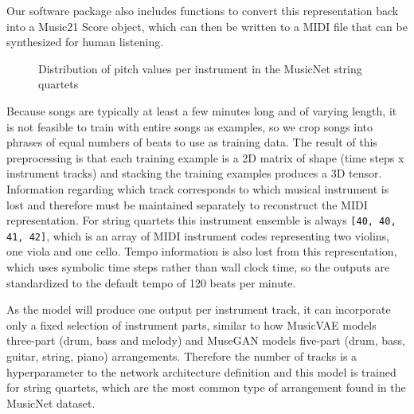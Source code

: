 \documentclass[sigconf,authorversion]{acmart}
\begin{document}
Our software package also includes functions to convert this
representation back into a Music21 Score object, which can then be
written to a MIDI file that can be synthesized for human listening.

\begin{figure}[htbp]
    \begin{center}
        \scalebox{0.6}{}
    \end{center}
    \caption{Distribution of pitch values per instrument in the MusicNet string quartets}
    \label{pitch_dist}
\end{figure}

Because songs are typically at least a few minutes long and of varying
length, it is not feasible to train with entire songs as examples, so
we crop songs into phrases of equal numbers of beats to use as
training data. The result of this preprocessing is that each training
example is a 2D matrix of shape (time steps x instrument tracks) and
stacking the training examples produces a 3D tensor. Information
regarding which track corresponds to which musical instrument is lost
and therefore must be maintained separately to reconstruct the MIDI
representation. For string quartets this instrument ensemble is always
\texttt{[40, 40, 41, 42]}, which is an array of MIDI instrument codes
representing two violins, one viola and one cello. Tempo information
is also lost from this representation, which uses symbolic time steps
rather than wall clock time, so the outputs are standardized to the
default tempo of 120 beats per minute.

As the model will produce one output per instrument track, it can
incorporate only a fixed selection of instrument parts, similar to how
MusicVAE models three-part (drum, bass and melody)
\cite{roberts_hierarchical_2018} and MuseGAN models five-part (drum,
bass, guitar, string, piano) arrangements. Therefore the number of
tracks is a hyperparameter to the network architecture definition and
this model is trained for string quartets, which are the most common
type of arrangement found in the MusicNet dataset.
\end{document}
